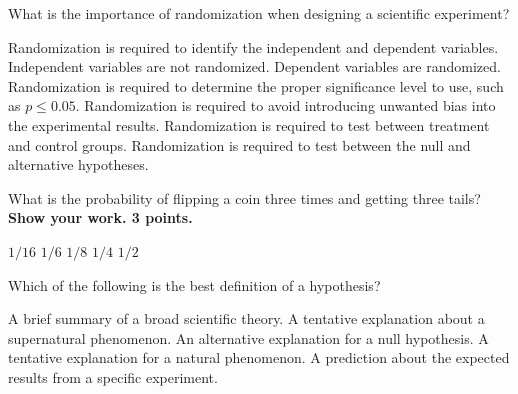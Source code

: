 \question
What is the importance of randomization when designing a scientific experiment?

\begin{choices}
\choice Randomization is required to identify the independent and dependent variables. Independent variables are not randomized. Dependent variables are randomized.
\choice Randomization is required to determine the proper significance level to use, such as $p \le 0.05$.
\correctchoice Randomization is required to avoid introducing unwanted bias into the experimental results.
\choice Randomization is required to test between treatment and control groups.
\choice Randomization is required to test between the null and alternative hypotheses.
\end{choices}

\question
What is the probability of flipping a coin three times and getting three tails? \textbf{Show your work. 3 points.}

\begin{choices}
\choice $1/16$
\choice $1/6$
\correctchoice $1/8$
\choice $1/4$
\choice $1/2$
\end{choices}

\question
Which of the following is the best definition of a hypothesis?

\begin{choices}
\choice A brief summary of a broad scientific theory.
\choice A tentative explanation about a supernatural phenomenon.
\choice An alternative explanation for a null hypothesis.
\correctchoice A tentative explanation for a natural phenomenon.
\choice A prediction about the expected results from a specific experiment.
\end{choices}
